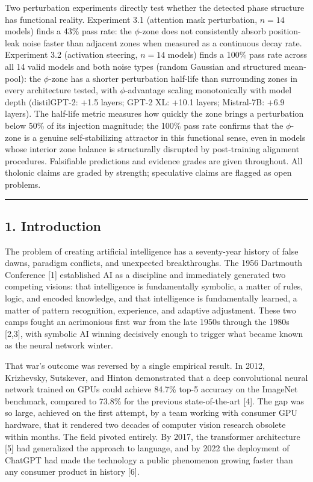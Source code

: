 \documentclass[
  11pt,
  letterpaper,
]{article}
\begin{document}
Two perturbation experiments directly test whether the detected phase
structure has functional reality. Experiment 3.1 (attention mask
perturbation, \(n = 14\) models) finds a 43\% pass rate: the
\(\phi\)-zone does not consistently absorb position-leak noise faster
than adjacent zones when measured as a continuous decay rate. Experiment
3.2 (activation steering, \(n = 14\) models) finds a 100\% pass rate
across all 14 valid models and both noise types (random Gaussian and
structured mean-pool): the \(\phi\)-zone has a shorter perturbation
half-life than surrounding zones in every architecture tested, with
\(\phi\)-advantage scaling monotonically with model depth (distilGPT-2:
+1.5 layers; GPT-2 XL: +10.1 layers; Mistral-7B: +6.9 layers). The
half-life metric measures how quickly the zone brings a perturbation
below 50\% of its injection magnitude; the 100\% pass rate confirms that
the \(\phi\)-zone is a genuine self-stabilizing attractor in this
functional sense, even in models whose interior zone balance is
structurally disrupted by post-training alignment procedures.
Falsifiable predictions and evidence grades are given throughout. All
tholonic claims are graded by strength; speculative claims are flagged
as open problems.

\begin{center}\rule{0.5\linewidth}{0.5pt}\end{center}

\subsection{1. Introduction}\label{introduction}

The problem of creating artificial intelligence has a seventy-year
history of false dawns, paradigm conflicts, and unexpected
breakthroughs. The 1956 Dartmouth Conference {[}1{]} established AI as a
discipline and immediately generated two competing visions: that
intelligence is fundamentally symbolic, a matter of rules, logic, and
encoded knowledge, and that intelligence is fundamentally learned, a
matter of pattern recognition, experience, and adaptive adjustment.
These two camps fought an acrimonious first war from the late 1950s
through the 1980s {[}2,3{]}, with symbolic AI winning decisively enough
to trigger what became known as the neural network winter.

That war's outcome was reversed by a single empirical result. In 2012,
Krizhevsky, Sutskever, and Hinton demonstrated that a deep convolutional
neural network trained on GPUs could achieve 84.7\% top-5 accuracy on
the ImageNet benchmark, compared to 73.8\% for the previous
state-of-the-art {[}4{]}. The gap was so large, achieved on the first
attempt, by a team working with consumer GPU hardware, that it rendered
two decades of computer vision research obsolete within months. The
field pivoted entirely. By 2017, the transformer architecture {[}5{]}
had generalized the approach to language, and by 2022 the deployment of
ChatGPT had made the technology a public phenomenon growing faster than
any consumer product in history {[}6{]}.
\end{document}
